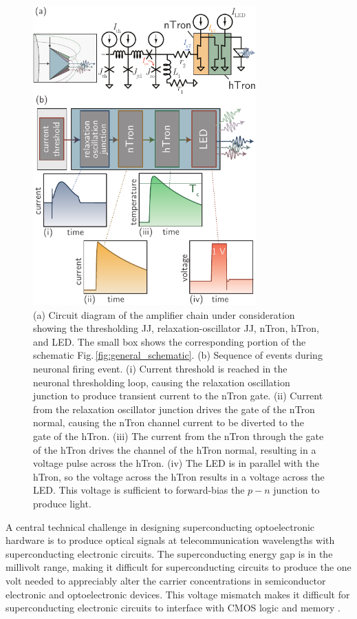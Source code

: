\documentclass[twocolumn]{article}
\begin{document}
\begin{figure}[t!]
	\centerline{\includegraphics[width=8.6cm]{_transmitters_schematic_small.pdf}}
	\caption{\label{fig:transmitters_schematic}(a) Circuit diagram of the amplifier chain under consideration showing the thresholding JJ, relaxation-oscillator JJ, nTron, hTron, and LED. The small box shows the corresponding portion of the schematic Fig.\,\ref{fig:general_schematic}. (b) Sequence of events during neuronal firing event. (i) Current threshold is reached in the neuronal thresholding loop, causing the relaxation oscillation junction to produce transient current to the nTron gate. (ii) Current from the relaxation oscillator junction drives the gate of the nTron normal, causing the nTron channel current to be diverted to the gate of the hTron. (iii) The current from the nTron through the gate of the hTron drives the channel of the hTron normal, resulting in a voltage pulse across the hTron. (iv) The LED is in parallel with the hTron, so the voltage across the hTron results in a voltage across the LED. This voltage is sufficient to forward-bias the $p-n$ junction to produce light.}
\end{figure}
	
A central technical challenge in designing superconducting optoelectronic hardware is to produce optical signals at telecommunication wavelengths with superconducting electronic circuits. The superconducting energy gap \cite{ti1996} is in the millivolt range, making it difficult for superconducting circuits to produce the one volt needed to appreciably alter the carrier concentrations in semiconductor electronic and optoelectronic devices. This voltage mismatch makes it difficult for superconducting electronic circuits to interface with CMOS logic \cite{ka1999} and memory \cite{vafe2002}. 
\end{document}
